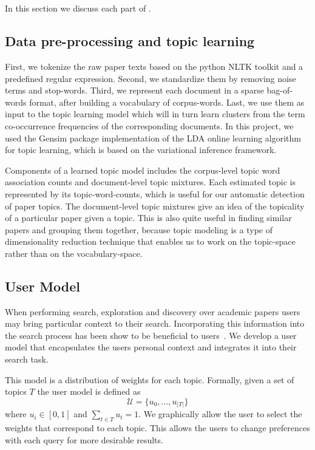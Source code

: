 \section{\system}

In this section we discuss each part of \system.

\subsection{Data pre-processing and topic learning}
First, we tokenize the raw paper texts based on the python NLTK toolkit and a
predefined regular expression. Second, we standardize them by removing noise terms
and stop-words. Third, we represent each document in a sparse 
bag-of-words format, after building a vocabulary of
corpus-words. Last, we use them as input to the topic learning model which will
in turn learn clusters from the term co-occurrence frequencies of the corresponding
documents. In this project, we used the Gensim 
package implementation of the LDA online learning algorithm 
\cite{rehurek_lrec, hoffman2010online} for topic learning, which is 
based on the variational inference framework.    

Components of a learned topic model includes the corpus-level topic word association counts
and document-level topic mixtures. Each estimated topic is represented
by its topic-word-counts, which is useful for our automatic detection of paper topics. 
The document-level topic mixtures give an idea of the topicality of a
particular paper given a topic. This is also quite useful in finding similar papers and
grouping them together, because topic modeling is a type of dimensionality reduction
technique that enables us to work on the topic-space rather than on 
the vocabulary-space.


\subsection{User Model}
When performing search, exploration and discovery over academic papers users 
may bring particular context to their search. Incorporating this information
into the search process has been show to be beneficial to 
users~\cite{DZSRWJ,MZPGSOL}.
We develop a user model that 
encapsulates the users personal context and integrates it into their
search task. 

This model is a distribution of weights for each topic.
Formally, given a set of topics $T$ the user model is defined as
$$
\mathcal{U} = \{u_0, \ldots, u_{|T|}\}
$$
where $u_i \in [0,1]$ and $\sum_{t \in T} u_t = 1$.
We graphically allow the user to select the weights that correspond to
each topic. This allows the users to change preferences with each query
for more desirable results.

